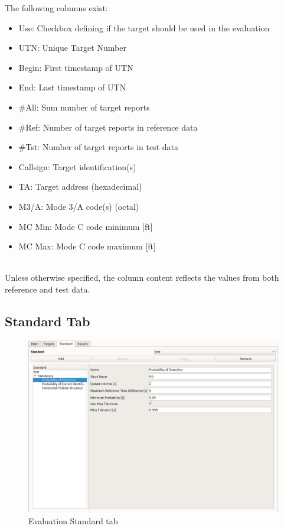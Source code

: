 The following columns exist:

\begin{itemize}  
\item Use: Checkbox defining if the target should be used in the evaluation
\item UTN: Unique Target Number
\item Begin: First timestamp of UTN
\item End: Last timestamp of UTN
\item \#All: Sum number of target reports
\item \#Ref: Number of target reports in reference data
\item \#Tst: Number of target reports in test data
\item Callsign: Target identification(s)
\item TA: Target address (hexadecimal)
\item M3/A: Mode 3/A code(s) (octal)
\item MC Min: Mode C code minimum [ft]
\item MC Max: Mode C code maximum [ft]
\end{itemize}
\ \\

Unless otherwise specified, the column content reflects the values from both reference and test data.

\subsection{Standard Tab}

\begin{figure}[H]
  \hspace*{-2cm}
    \includegraphics[width=18cm,frame]{../screenshots/eval_standard.png}
  \caption{Evaluation Standard tab}
\end{figure}

